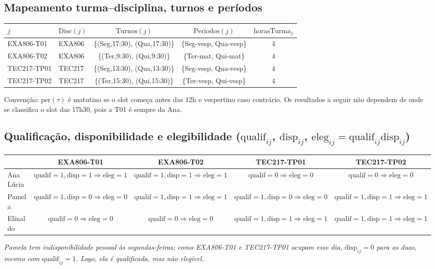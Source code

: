 \documentclass[11pt,a4paper]{article}
\begin{document}
\subsection{Mapeamento turma--disciplina, turnos e períodos}
\begin{center}
\small
\begin{tabular}{llccc}
\toprule
$j$ & $\text{Disc}(j)$ & $\text{Turnos}(j)$ & $\text{Periodos}(j)$ & $\mathrm{horasTurma}_{j}$ \\
\midrule
EXA806-T01  & EXA806 & \{(Seg,17:30), (Qua,17:30)\} & \{Seg-vesp, Qua-vesp\} & 4 \\
EXA806-T02  & EXA806 & \{(Ter,9:30), (Qui,9:30)\}   & \{Ter-mat, Qui-mat\}   & 4 \\
TEC217-TP01 & TEC217 & \{(Seg,13:30), (Qua,13:30)\} & \{Seg-vesp, Qua-vesp\} & 4 \\
TEC217-TP02 & TEC217 & \{(Ter,15:30), (Qui,15:30)\} & \{Ter-vesp, Qui-vesp\} & 4 \\
\bottomrule
\end{tabular}
\end{center}
Convenção: $\text{per}(\tau)$ é matutino se o slot começa antes das 12h e vespertino caso contrário. Os resultados a seguir não dependem de onde se classifica o slot das 17h30, pois a T01 é sempre da Ana.

\subsection{Qualificação, disponibilidade e elegibilidade ($\mathrm{qualif}_{ij}$, $\mathrm{disp}_{ij}$, $\mathrm{eleg}_{ij}=\mathrm{qualif}_{ij}\mathrm{disp}_{ij}$)}
\begin{center}
\small
\begin{tabular}{lcccc}
\toprule
 & EXA806-T01 & EXA806-T02 & TEC217-TP01 & TEC217-TP02 \\
\midrule
Ana Lúcia & $\mathrm{qualif}{=}1,\mathrm{disp}{=}1\Rightarrow\mathrm{eleg}{=}1$ & $\mathrm{qualif}{=}1,\mathrm{disp}{=}1\Rightarrow\mathrm{eleg}{=}1$ & $\mathrm{qualif}{=}0\Rightarrow\mathrm{eleg}{=}0$ & $\mathrm{qualif}{=}0\Rightarrow\mathrm{eleg}{=}0$ \\
Pamela    & $\mathrm{qualif}{=}1,\mathrm{disp}{=}0\Rightarrow\mathrm{eleg}{=}0$ & $\mathrm{qualif}{=}1,\mathrm{disp}{=}1\Rightarrow\mathrm{eleg}{=}1$ & $\mathrm{qualif}{=}1,\mathrm{disp}{=}0\Rightarrow\mathrm{eleg}{=}0$ & $\mathrm{qualif}{=}1,\mathrm{disp}{=}1\Rightarrow\mathrm{eleg}{=}1$ \\
Elinaldo  & $\mathrm{qualif}{=}0\Rightarrow\mathrm{eleg}{=}0$ & $\mathrm{qualif}{=}0\Rightarrow\mathrm{eleg}{=}0$ & $\mathrm{qualif}{=}1,\mathrm{disp}{=}1\Rightarrow\mathrm{eleg}{=}1$ & $\mathrm{qualif}{=}1,\mathrm{disp}{=}1\Rightarrow\mathrm{eleg}{=}1$ \\
\bottomrule
\end{tabular}
\end{center}
\emph{Pamela tem indisponibilidade pessoal às segundas-feiras; como EXA806-T01 e TEC217-TP01 ocupam esse dia, $\mathrm{disp}_{ij}=0$ para as duas, mesmo com $\mathrm{qualif}_{ij}=1$. Logo, ela é qualificada, mas não elegível.}
\end{document}
